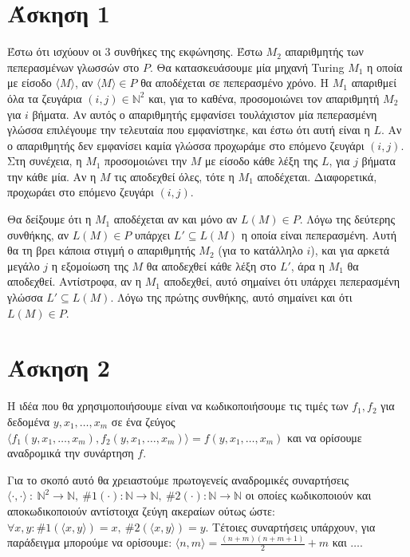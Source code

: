 \documentclass[a4paper, oneside, 11pt]{article}
\theoremstyle{definition}
\begin{document}


\section*{Άσκηση 1}
Έστω ότι ισχύουν οι 3 συνθήκες της εκφώνησης. Έστω $M_2$ απαριθμητής των πεπερασμένων γλωσσών στο $P$. Θα κατασκευάσουμε μία μηχανή Turing $M_1$ η οποία
με είσοδο $\langle M\rangle$, αν $\langle M\rangle\in P$ θα αποδέχεται σε πεπερασμένο χρόνο. Η $M_1$ απαριθμεί όλα τα ζευγάρια
$(i,j)\in \mathbb{N}^2$ και, για το καθένα, προσομοιώνει τον απαριθμητή $M_2$ για $i$ βήματα. Αν αυτός ο απαριθμητής εμφανίσει τουλάχιστον μία
πεπερασμένη γλώσσα επιλέγουμε την τελευταία που εμφανίστηκε, και έστω ότι αυτή είναι η $L$. Αν ο απαριθμητής δεν εμφανίσει καμία γλώσσα προχωράμε στο
επόμενο ζευγάρι $(i,j)$. Στη συνέχεια, η $M_1$ προσομοιώνει την $M$ με είσοδο κάθε λέξη της $L$, για $j$ βήματα την κάθε μία. Αν η $M$ τις αποδεχθεί
όλες, τότε η $M_1$ αποδέχεται. Διαφορετικά, προχωράει στο επόμενο ζευγάρι $(i,j)$.

Θα δείξουμε ότι η $M_1$ αποδέχεται αν και μόνο αν $L(M)\in P$. Λόγω της δεύτερης συνθήκης, αν $L(M)\in P$
υπάρχει $L'\subseteq L(M)$ η οποία είναι πεπερασμένη.
Αυτή θα τη βρει κάποια στιγμή ο απαριθμητής $M_2$ (για το κατάλληλο $i$), και για αρκετά μεγάλο $j$ η εξομοίωση της $M$ θα αποδεχθεί κάθε λέξη
στο $L'$, άρα η $M_1$ θα αποδεχθεί. Αντίστροφα, αν η $M_1$ αποδεχθεί, αυτό σημαίνει ότι υπάρχει πεπερασμένη γλώσσα $L'\subseteq L(M)$. Λόγω της πρώτης
συνθήκης, αυτό σημαίνει και ότι $L(M)\in P$.

\section*{Άσκηση 2}
Η ιδέα που θα χρησιμοποιήσουμε είναι να κωδικοποιήσουμε τις τιμές των $f_1, f_2$
για δεδομένα $y, x_1, \ldots, x_m$ σε ένα ζεύγος $\langle f_1(y, x_1, \ldots,
x_m), f_2(y, x_1, \ldots, x_m) \rangle = f(y, x_1, \ldots, x_m)$ και να ορίσουμε
αναδρομικά την συνάρτηση $f$.

Για το σκοπό αυτό θα χρειαστούμε πρωτογενείς αναδρομικές συναρτήσεις $\langle
\cdot, \cdot \rangle\ :\ \mathbb{N}^2 \rightarrow \mathbb{N},\ \#1(\cdot) :
\mathbb{N} \rightarrow \mathbb{N},\ \#2(\cdot) : \mathbb{N} \rightarrow
\mathbb{N}$ οι οποίες κωδικοποιούν και αποκωδικοποιούν αντίστοιχα ζεύγη ακεραίων
ούτως ώστε: $\forall x, y : \#1( \langle x, y \rangle ) = x,\ \#2(\langle x, y
\rangle) = y$. Τέτοιες συναρτήσεις υπάρχουν, για παράδειγμα μπορούμε να
ορίσουμε: $\langle n, m \rangle = \frac{ (n+m)(n+m+1) }{2} + m$ και $\ldots$.
\end{document}
